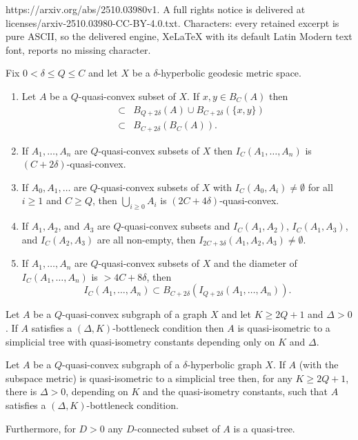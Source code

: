 \documentclass[10pt,a4paper]{amsart}
\begin{document}
https://arxiv.org/abs/2510.03980v1. A full rights notice is delivered at licenses/arxiv-2510.03980-CC-BY-4.0.txt. Characters: every retained excerpt is pure ASCII, so the delivered engine, XeLaTeX with its default Latin Modern text font, reports no missing character.
\begin{lemma}\label{fellow travel}
Fix $0<\delta\le Q \le C$ and let $X$ be a $\delta$-hyperbolic geodesic metric space.
\begin{enumerate}
\item Let $A$ be a $Q$-quasi-convex subset of $X$. If $x,y \in B_C(A)$ then 
\begin{eqnarray*}
[x,y] &\subset & B_{Q+2\delta}(A) \cup B_{C+2\delta}(\{x,y\})\\  & \subset & B_{C+2\delta}(B_C(A)).
\end{eqnarray*}

\item\label{intersection quasiconvex} If $A_1, \dots, A_n$ are $Q$-quasi-convex subsets of $X$  then $I_C(A_1, \dots, A_n)$ is $(C+2\delta)$-quasi-convex.

\item\label{union quasiconvex} If $A_0, A_1, \dots$ are $Q$-quasi-convex subsets of $X$ with $I_C(A_0, A_i) \neq \emptyset$ for all $i\ge 1$ and $C\ge Q$, then $\bigcup_{i\ge 0} A_i$ is $(2C+4\delta)$-quasi-convex.

\item\label{triple} If $A_1, A_2$, and $A_3$ are $Q$-quasi-convex subsets and $I_C(A_1, A_2)$, $I_C(A_1, A_3)$, and $I_C(A_2, A_3)$ are all non-empty, then $I_{2C+3\delta}(A_1, A_2, A_3) \neq \emptyset$.

\item\label{larger}  If $A_1, \dots, A_n$ are $Q$-quasi-convex subsets of $X$ and the diameter of $I_C(A_1, \dots, A_n)$ is $> 4C + 8\delta$, then
$$I_C(A_1, \dots, A_n) \subset B_{C+2\delta}(I_{Q+2\delta}(A_1, \dots, A_n)).$$
\end{enumerate}
\end{lemma}

\begin{cor}\label{geodesic_bottleneck}
Let $A$ be a $Q$-quasi-convex subgraph of a graph $X$ and let $K \ge 2Q+1$ and $\Delta>0$. If $A$ satisfies a
$(\Delta, K)$-bottleneck condition then $A$ is quasi-isometric to a simplicial tree with quasi-isometry constants depending only on $K$ and $\Delta$.
\end{cor}

\begin{prop}\label{bottleneck_converse}
Let $A$ be a $Q$-quasi-convex subgraph of a $\delta$-hyperbolic graph $X$. If $A$
(with the subspace metric) is quasi-isometric to a simplicial tree then,
for any $K\ge 2Q+1$, there is $\Delta>0$, depending on $K$ and the quasi-isometry constants, such that $A$ satisfies a $(\Delta, K)$-bottleneck condition.

Furthermore, for $D>0$ any $D$-connected subset of $A$ is a quasi-tree.
\end{prop}
\end{document}
